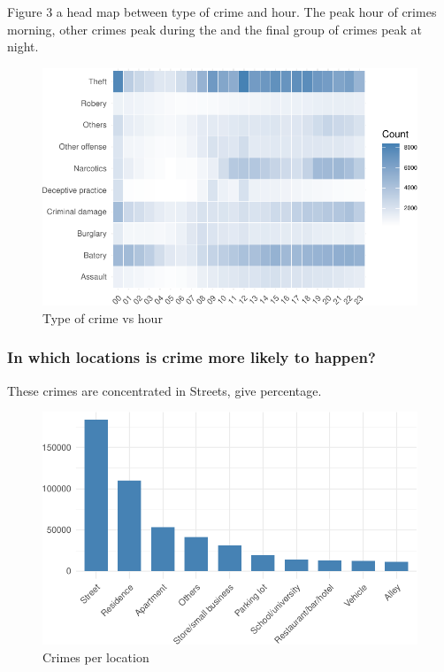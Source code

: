 \documentclass[]{article}
\begin{document}
Figure 3 a head map between type of crime and hour. The peak hour of
crimes morning, other crimes peak during the and the final group of
crimes peak at night.

\begin{figure}[H]

{\centering \includegraphics{Assessment_1v12_files/figure-latex/fig9-1} 

}

\caption{Type of crime vs hour}\label{fig:fig9}
\end{figure}

\subsubsection{In which locations is crime more likely to
happen?}\label{in-which-locations-is-crime-more-likely-to-happen}

These crimes are concentrated in Streets, give percentage.

\begin{figure}[H]

{\centering \includegraphics{Assessment_1v12_files/figure-latex/fig7-1} 

}

\caption{Crimes per location}\label{fig:fig7}
\end{figure}
\end{document}
